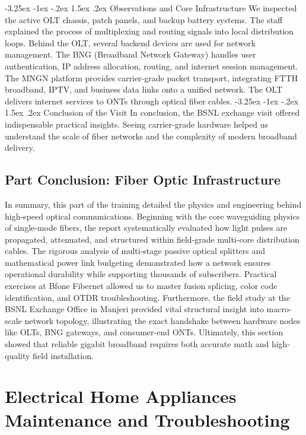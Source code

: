 \documentclass[11pt,a4paper]{report}
\makeatletter
\renewcommand{\section}{\@startsection{section}{1}{\z@}%
  {-3.25ex \@plus -1ex \@minus -.2ex}%
  {1.5ex \@plus.2ex}%
  {\normalfont\Large\bfseries\color{primaryColor}}}
\makeatother
\begin{document}
\section{Observations and Core Infrastructure}
We inspected the active OLT chassis, patch panels, and backup battery systems. The staff explained the process of multiplexing and routing signals into local distribution loops. Behind the OLT, several backend devices are used for network management. The BNG (Broadband Network Gateway) handles user authentication, IP address allocation, routing, and internet session management. The MNGN platform provides carrier-grade packet transport, integrating FTTH broadband, IPTV, and business data links onto a unified network. The OLT delivers internet services to ONTs through optical fiber cables.
\section{Conclusion of the Visit}
In conclusion, the BSNL exchange visit offered indispensable practical insights. Seeing carrier-grade hardware helped us understand the scale of fiber networks and the complexity of modern broadband delivery.
\chapter*{Part Conclusion: Fiber Optic Infrastructure}
In summary, this part of the training detailed the physics and engineering behind high-speed optical communications. Beginning with the core waveguiding physics of single-mode fibers, the report systematically evaluated how light pulses are propagated, attenuated, and structured within field-grade multi-core distribution cables. The rigorous analysis of multi-stage passive optical splitters and mathematical power link budgeting demonstrated how a network ensures operational durability while supporting thousands of subscribers. Practical exercises at Bfone Fibernet allowed us to master fusion splicing, color code identification, and OTDR troubleshooting. Furthermore, the field study at the BSNL Exchange Office in Manjeri provided vital structural insight into macro-scale network topology, illustrating the exact handshake between hardware nodes like OLTs, BNG gateways, and consumer-end ONTs. Ultimately, this section showed that reliable gigabit broadband requires both accurate math and high-quality field installation.
\part{Electrical Home Appliances Maintenance and Troubleshooting}
\end{document}

